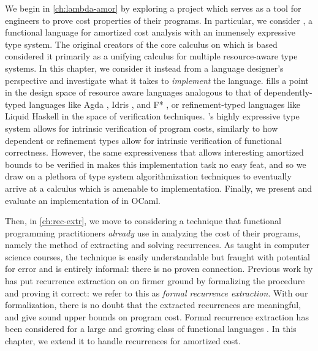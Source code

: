 
We begin in \autoref{ch:lambda-amor} by exploring a project which serves as a tool for engineers to prove cost properties of their programs. In particular, we consider \lambdaamorimpl, a functional language for amortized cost analysis with an immensely expressive type system. The original creators of the core calculus on which \lambdaamorimpl is based \cite{rajani-et-al:popl21} considered it primarily as a unifying calculus for multiple resource-aware type systems. In this chapter, we consider it instead from a language designer's perspective and investigate what it takes to \textit{implement} the language. \lambdaamorimpl fills a point in the design space of resource aware languages analogous to that of dependently-typed languages like Agda \cite{norell:afp08}, Idris \cite{brady:jfp13}, and F* \cite{swamy-et-al:pldi13}, or refinement-typed languages like Liquid Haskell \cite{vazou-et-al:icfp14} in the space of verification techniques. \lambdaamorimpl's highly expressive type system  allows for intrinsic verification \cite{korkut-et-al:regex} of program costs, similarly to how dependent or refinement types allow for intrinsic verification of functional correctness. However, the same expressiveness that allows interesting amortized bounds to be verified in \lambdaamorimpl makes this implementation task no easy feat, and so we draw on a plethora of type system algorithmization techniques to eventually arrive at a calculus which is amenable to implementation. Finally, we present and evaluate an implementation of \lambdaamorimpl in OCaml.

Then, in \autoref{ch:rec-extr}, we move to considering a technique that functional programming practitioners \textit{already} use in analyzing the cost of their programs, namely the method of extracting and solving recurrences. As taught in computer science courses, the technique is easily understandable but fraught with potential for error and is entirely informal: there is no proven connection. Previous work by \citet{danner-et-al:plpv13} \cite{danner-et-al:icfp15} has put recurrence extraction on on firmer ground by formalizing the procedure and proving it correct: we refer to this as \textit{formal recurrence extraction}. With our formalization, there is no doubt that the extracted recurrences are meaningful, and give sound upper bounds on program cost. Formal recurrence extraction has been considered for a large and growing class of functional languages \cite{kavvos-et-al:popl20} \cite{danner2021denotational}. In this chapter, we extend it to handle recurrences for amortized cost.
\\


